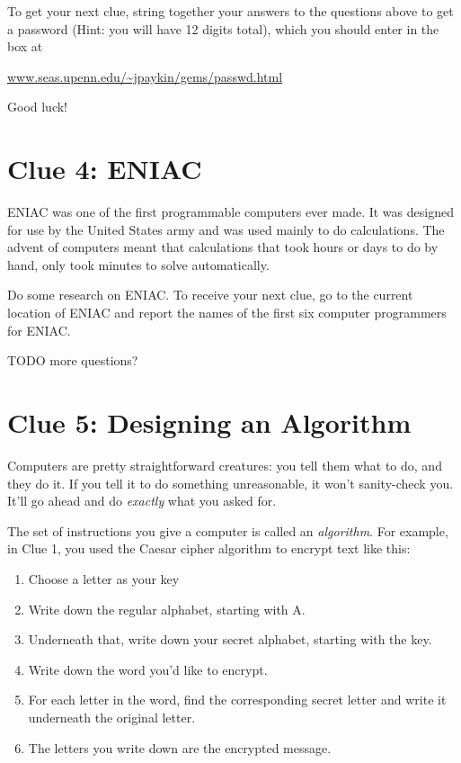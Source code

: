 \documentclass{article}
\begin{document}


To get your next clue, string together your answers to the questions above to
get a password (Hint: you will have 12 digits total), which you should enter in
the box at
\begin{center}
    \url{www.seas.upenn.edu/~jpaykin/gems/passwd.html}
\end{center}
Good luck!
  
\newpage


\section*{Clue 4: ENIAC}
ENIAC was one of the first programmable computers ever made. It was designed for use by the United States army and was used mainly to do calculations. The advent of computers meant that calculations that took hours or days to do by hand, only took minutes to solve automatically.

Do some research on ENIAC. To receive your next clue, go to the current location of ENIAC and report the names of the first six computer programmers for ENIAC.

TODO more questions?

\newpage

\section*{Clue 5: Designing an Algorithm}
Computers are pretty straightforward creatures: you tell them what to do, and they do it. If you tell it to do something unreasonable, it won't sanity-check you. It'll go ahead and do \textit{exactly} what you asked for.

The set of instructions you give a computer is called an \textit{algorithm}. For example, in Clue 1, you used the Caesar cipher algorithm to encrypt text like this:
\begin{enumerate}[noitemsep]
  \item Choose a letter as your key
  \item Write down the regular alphabet, starting with A.
  \item Underneath that, write down your secret alphabet, starting with the key.
  \item Write down the word you'd like to encrypt.
  \item For each letter in the word, find the corresponding secret letter and write it underneath the original letter.
  \item The letters you write down are the encrypted message.
\end{enumerate}
\end{document}

